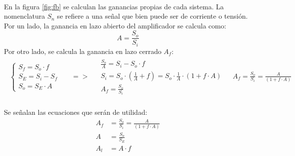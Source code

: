 \paragraph{}
En la figura \ref{fig:fb} se calculan las ganancias propias de cada sistema. La nomenclatura $S_n$ se refiere a una señal que bien puede ser de corriente o tensión.
Por un lado, la ganancia en lazo abierto del amplificador se calcula como:
$$A = \frac{S_o}{S_i} $$
Por otro lado, se calcula la ganancia en lazo cerrado $A_f$:
\[
\begin{array}{rccl} 
      \begin{array}{l}
	 \begin{cases}
	    S_f = S_o \cdot f \\
	    S_E = S_i - S_f \\
	    S_o = S_E \cdot A
	 \end{cases}
      \end{array}
      &
      \begin{array}{l}
	  =>
      \end{array}
      &
      \begin{array}{l}
	 \frac{S_o}{A} = S_i - S_o \cdot f \\
	 S_i = S_o \cdot \left(\frac{1}{A} + f \right) = S_o \cdot \frac{1}{A} \cdot (1 + f \cdot A) \\
	 A_f = \frac{S_o}{S_i}
      \end{array}
      &
      \begin{array}{l}
	 A_f = \frac{S_o}{S_i} = \frac{A}{(1 + f \cdot A)} 
      \end{array}
\end{array}
\]
\paragraph{}
Se señalan las ecuaciones que ser\'an de utilidad:
\begin{align}
   \label{eq:feedback}
   A_f &= \frac{S_o}{S_i} = \frac{A}{(1 + f \cdot A)} \\
   \label{eq:A}
   A &= \frac{S_o}{S_E} \\
   \label{eq:Al}
   A_l &= A \cdot f
\end{align}
